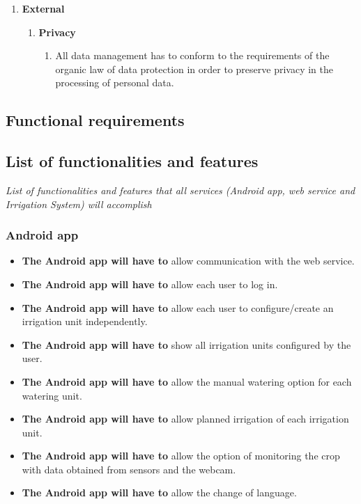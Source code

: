 \documentclass[11pt,a4paper]{article}
\begin{document}
\begin{enumerate}
\item \textbf{External}
	\begin{enumerate}
	\item \textbf{Privacy} 
		\begin{enumerate}
		\item All data management has to conform to the requirements of the organic law of data protection in order to preserve privacy in the processing of personal data.
		\end{enumerate}
		
	\end{enumerate}

\end{enumerate}

\subsection{Functional requirements}
\subsection{List of functionalities and features}
\textit{List of functionalities and features that all services (Android app, web service and Irrigation System) will accomplish}

\subsubsection{Android app}
\begin{itemize}
\item \textbf{The Android app will have to} allow communication with the web service.

\item \textbf{The Android app will have to} allow each user to log in.

\item \textbf{The Android app will have to} allow each user to configure/create an irrigation unit independently.

\item \textbf{The Android app will have to} show all irrigation units configured by the user.

\item \textbf{The Android app will have to} allow the manual watering option for each watering unit.

\item \textbf{The Android app will have to} allow planned irrigation of each irrigation unit.

\item \textbf{The Android app will have to} allow the option of monitoring the crop with data obtained from sensors and the webcam.

\item \textbf{The Android app will have to} allow the change of language.
\end{itemize}
\end{document}

